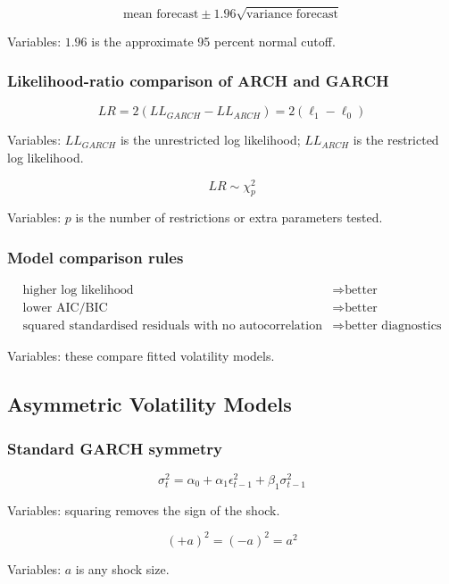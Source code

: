 \documentclass[
  8pt,
  twocolumn]{extarticle}
\begin{document}
\[
\text{mean forecast}\pm1.96\sqrt{\text{variance forecast}}
\]

Variables: \(1.96\) is the approximate 95 percent normal cutoff.

\subsubsection{Likelihood-ratio comparison of ARCH and
GARCH}\label{likelihood-ratio-comparison-of-arch-and-garch}

\[
LR=2(LL_{GARCH}-LL_{ARCH})=2(\ell_1-\ell_0)
\]

Variables: \(LL_{GARCH}\) is the unrestricted log likelihood;
\(LL_{ARCH}\) is the restricted log likelihood.

\[
LR\sim\chi_p^2
\]

Variables: \(p\) is the number of restrictions or extra parameters
tested.

\subsubsection{Model comparison rules}\label{model-comparison-rules}

\[
\begin{aligned}
\text{higher log likelihood}&\Rightarrow \text{better}\\
\text{lower AIC/BIC}&\Rightarrow \text{better}\\
\text{squared standardised residuals with no autocorrelation}&\Rightarrow \text{better diagnostics}
\end{aligned}
\]

Variables: these compare fitted volatility models.

\subsection{Asymmetric Volatility
Models}\label{asymmetric-volatility-models}

\subsubsection{Standard GARCH symmetry}\label{standard-garch-symmetry}

\[
\sigma_t^2=\alpha_0+\alpha_1\epsilon_{t-1}^2+\beta_1\sigma_{t-1}^2
\]

Variables: squaring removes the sign of the shock.

\[
(+a)^2=(-a)^2=a^2
\]

Variables: \(a\) is any shock size.
\end{document}
